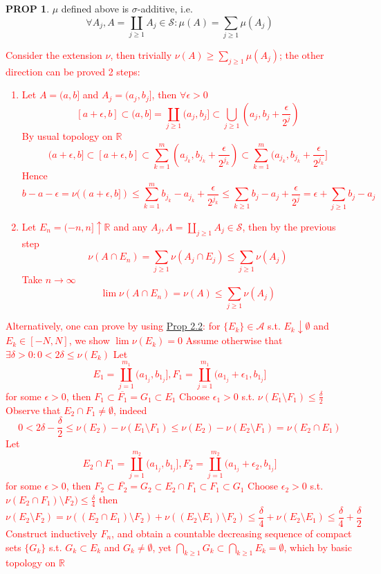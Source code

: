\documentclass[hidelinks]{article}
\theoremstyle{definition}
\theoremstyle{dotless}
\newtheorem{proposition}{PROP}[section]
\theoremstyle{remark}
\begin{document}
\begin{proposition}\label{PROP 5.7}
$\mu$ defined above is $\sigma$-additive, i.e.
\[\forall A_j,A=\coprod_{j\geq1}A_j\in\mathscr{S}:\mu(A)=\sum_{j\geq1}\mu(A_j)\]
\end{proposition}
\textcolor{red}{Consider the extension $\nu$, then trivially $\nu(A)\geq\sum_{j\geq1}\mu(A_j)$; the other direction can be proved 2 steps:
\begin{enumerate}[label=\arabic*\degree]
    \item Let $A=(a,b]$ and $A_j=(a_j,b_j]$, then $\forall\epsilon>0$
    \[[a+\epsilon,b]\subset(a,b]=\coprod_{j\geq1}(a_j,b_j]\subset\bigcup_{j\geq1}(a_j,b_j+\frac{\epsilon}{2^j})\]
    By usual topology on $\mathbb{R}$
    \[(a+\epsilon,b]\subset[a+\epsilon,b]\subset\sum_{k=1}^m(a_{j_k},b_{j_k}+\frac{\epsilon}{2^{j_k}})\subset\sum_{k=1}^m(a_{j_k},b_{j_k}+\frac{\epsilon}{2^{j_k}}]\]
    Hence
    \[b-a-\epsilon=\nu((a+\epsilon,b])\leq\sum_{k=1}^mb_{j_k}-a_{j_k}+\frac{\epsilon}{2^{j_k}}\leq\sum_{k\geq1}b_j-a_j+\frac{\epsilon}{2^j}=\epsilon+\sum_{j\geq1}b_j-a_j\]
    \item Let $E_n=(-n,n]\uparrow\mathbb{R}$ and any $A_j,A=\coprod_{j\geq1}A_j\in\mathscr{S}$, then by the previous step
    \[\nu(A\cap E_n)=\sum_{j\geq1}\nu(A_j\cap E_j)\leq\sum_{j\geq1}\nu(A_j)\]
    Take $n\to\infty$
    \[\lim\nu(A\cap E_n)=\nu(A)\leq\sum_{j\geq1}\nu(A_j)\]
\end{enumerate}\bigbreak
Alternatively, one can prove by using \hyperref[Prop 2.2]{Prop 2.2}: for $\{E_k\}\in\mathscr{A}$ s.t. $E_k\downarrow\emptyset$ and $E_k\in[-N,N]$, we show $\lim\nu(E_k)=0$\smallbreak
Assume otherwise that $\exists\delta>0:0<2\delta\leq\nu(E_k)$\newline
Let
\[E_1=\coprod\limits_{j=1}^{m_1}(a_{1_j},b_{1_j}],F_1=\coprod\limits_{j=1}^{m_1}(a_{1_j}+\epsilon_1,b_{1_j}]\]
for some $\epsilon>0$, then $F_1\subset\overline{F_1}=G_1\subset E_1$\newline
Choose $\epsilon_1>0$ s.t. $\nu(E_1\setminus F_1)\leq\frac{\delta}{2}$\medbreak
Observe that $E_2\cap F_1\neq\emptyset$, indeed
\[0<2\delta-\frac{\delta}{2}\leq\nu(E_2)-\nu(E_1\setminus F_1)\leq\nu(E_2)-\nu(E_2\setminus F_1)=\nu(E_2\cap E_1)\]
Let
\[E_2\cap F_1=\coprod\limits_{j=1}^{m_2}(a_{1_j},b_{1_j}],F_2=\coprod\limits_{j=1}^{m_2}(a_{1_j}+\epsilon_2,b_{1_j}]\]
for some $\epsilon>0$, then $F_2\subset\overline{F_2}=G_2\subset E_2\cap F_1\subset F_1\subset G_1$\newline
Choose $\epsilon_2>0$ s.t. $\nu(E_2\cap F_1)\setminus F_2)\leq\frac{\delta}{4}$\newline
then
\[\nu(E_2\setminus F_2)=\nu((E_2\cap E_1)\setminus F_2)+\nu((E_2\setminus E_1)\setminus F_2)\leq\frac{\delta}{4}+\nu(E_2\setminus E_1)\leq\frac{\delta}{4}+\frac{\delta}{2}\]
Construct inductively $F_n$, and obtain a countable decreasing sequence of compact sets $\{G_k\}$ s.t. $G_k\subset E_k$ and $G_k\neq\emptyset$, yet $\bigcap\limits_{k\geq1}G_k\subset\bigcap\limits_{k\geq1}E_k=\emptyset$, which by basic topology on $\mathbb{R}$ \Lightning}
\end{document}
